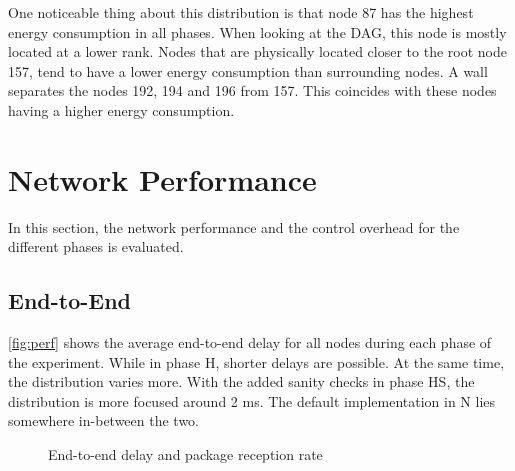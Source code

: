 One noticeable thing about this distribution is that node 87 has the highest
energy consumption in all phases. When looking at the \ac{DAG}, this node is
mostly located at a lower rank. Nodes that are physically located closer to the
root node 157, tend to have a lower energy consumption than surrounding nodes.
A wall separates the nodes 192, 194 and 196 from 157. This coincides with these
nodes having a higher energy consumption.

\section{Network Performance}

In this section, the network performance and the control overhead for the
different phases is evaluated.

\subsection{End-to-End}

\autoref{fig:perf} shows the average end-to-end delay for all nodes during each
phase of the experiment. While in phase H, shorter delays are possible. At the
same time, the distribution varies more. With the added sanity checks in phase
HS, the distribution is more focused around 2 ms. The default implementation in
N lies somewhere in-between the two.

\begin{figure}
  \centering
  \caption{End-to-end delay and package reception rate}
  \label{fig:perf}
\end{figure}

